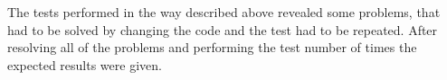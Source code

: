 The tests performed in the way described above revealed some problems, that had to be solved by changing the code and the test had to be repeated. After resolving all of the problems and performing the test number of times the expected results were given.

\let\cleardoublepage\clearpage


